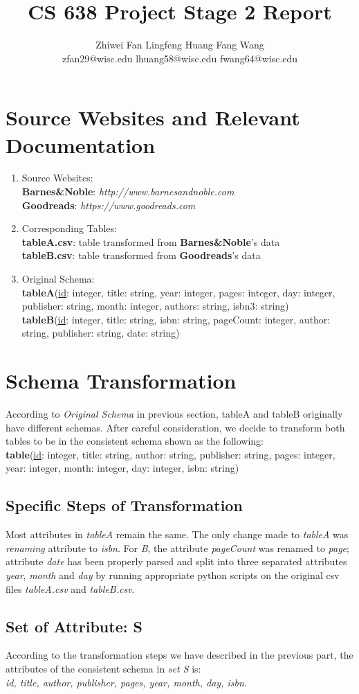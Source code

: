 \documentclass[10pt, oneside]{article}
\title{\textbf{CS 638 Project Stage 2 Report}}
\author{Zhiwei Fan\hspace{7ex}
	   Lingfeng Huang\hspace{7ex}
	   Fang Wang\\
	   zfan29@wisc.edu\hspace{3ex}
	   lhuang58@wisc.edu\hspace{3ex}
	   fwang64@wisc.edu
	   }
\begin{document}
\maketitle 

\section*{Source Websites and Relevant Documentation}
\begin{enumerate}
  	\item Source Websites:\\
		\textbf{Barnes\&Noble}: \textit{http://www.barnesandnoble.com}\\
		\textbf{Goodreads}: \textit{https://www.goodreads.com}
		
	\item Corresponding Tables:\\
		\textbf{tableA.csv}: table transformed from \textbf{Barnes\&Noble}'s data\\
		\textbf{tableB.csv}: table transformed from \textbf{Goodreads}'s data
		
	\item Original Schema:\\
		\textbf{tableA}(\underline{id}: integer, title: string, year: integer, pages: integer, day: integer, publisher: string, month: integer, authors: string, isbn3: string)\\
		\textbf{tableB}(\underline{id}: integer, title: string, isbn: string, pageCount: integer, author: string, publisher: string, date: string)	
\end{enumerate}

\section*{Schema Transformation}
According to \textit{Original Schema} in previous section, tableA and tableB originally have different schemas. After careful consideration, we decide to transform both tables to 
be in the consistent schema shown as the following: 
\vspace{1ex}
 \\
 \textbf{table}(\underline{id}: integer, title: string, author: string, publisher: string, pages: integer, year: integer, month: integer, day: integer, isbn: string)
 
 \subsection*{Specific Steps of Transformation}
 Most attributes in \textit{tableA} remain the same. The only change made to \textit{tableA} was \textit{renaming} attribute  to \textit{isbn}. For \textit{B}, the attribute
 \textit{pageCount} was renamed to \textit{page}; attribute \textit{date} has been properly parsed and split into three separated attributes \textit{year}, \textit{month} and \textit{day}
 by running appropriate python scripts on the original csv files \textit{tableA.csv} and \textit{tableB.csv}.
 
 \subsection*{Set of Attribute: S}
 According to the transformation steps we have described in the previous part, the attributes of the consistent schema in \textit{set S} is: \\
\textit{ id, title, author, publisher, pages, year, month, day, isbn}.
 
\end{document}
